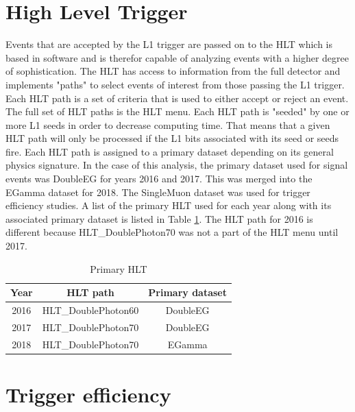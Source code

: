 \section{High Level Trigger}
Events that are accepted by the L1 trigger are passed on to the HLT which is based in software and is therefor capable of analyzing events with a higher degree of sophistication.  The HLT has access to information from the full detector and implements "paths" to select events of interest from those passing the L1 trigger.  Each HLT path is a set of criteria that is used to either accept or reject an event.  The full set of HLT paths is the HLT menu.  Each HLT path is "seeded" by one or more L1 seeds in order to decrease computing time.  That means that a given HLT path will only be processed if the L1 bits associated with its seed or seeds fire.  Each HLT path is assigned to a primary dataset depending on its general physics signature.  In the case of this analysis, the primary dataset used for signal events was DoubleEG for years 2016 and 2017.  This was merged into the EGamma dataset for 2018.  The SingleMuon dataset was used for trigger efficiency studies.  A list of the primary HLT used for each year along with its associated primary dataset is listed in Table \ref{table:HLTlist}.  The HLT path for 2016 is different because HLT\_DoublePhoton70 was not a part of the HLT menu until 2017.


\begin{table}[h!]
\centering
	\caption{Primary HLT}
	\begin{tabular}{|c|c|c|}
		\hline
		Year & HLT path & Primary dataset \\
		\hline
		2016 & HLT\_DoublePhoton60 & DoubleEG \\
		\hline
		2017 & HLT\_DoublePhoton70 & DoubleEG \\
		\hline
		2018 & HLT\_DoublePhoton70 & EGamma \\
		\hline
	\end{tabular}
\label{table:HLTlist}
\end{table}
\section{Trigger efficiency}

 